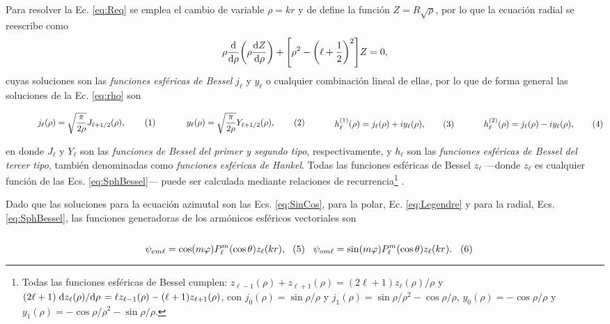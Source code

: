 Para resolver la Ec. \eqref{eq:Req} se emplea el cambio de variable $\rho = k r$ y de define la función $Z =R\sqrt{\rho}$, por lo que la ecuación radial se reescribe como 
	\begin{align}
	\rho \dv{\rho}\qty(\rho\dv{Z}{\rho})+\qty[\rho^2-\qty(\ell+\frac12)^2] Z = 0,
	\label{eq:rho}
	\end{align}
cuyas soluciones son las \emph{funciones esféricas de Bessel} $j_\ell$ y $y_\ell$ o cualquier combinación lineal de ellas, por lo que de forma general las soluciones de la Ec. \eqref{eq:rho} son \cite{arfken2001methods} 

	\begin{subequations}
	\eqhalf{j_\ell (\rho) = \sqrt{\frac{\pi}{2\rho}} J_{\ell+1/2}(\rho), \label{eqs:jn}}
	\eqhalf{y_\ell (\rho) = \sqrt{\frac{\pi}{2\rho}} Y_{\ell+1/2}(\rho), \label{eqs:yn}}
	\eqhalf{h_\ell^{(1)} (\rho) = j_\ell(\rho) + i y_\ell(\rho), \label{eqs:h1}}
	\eqhalf{h_\ell^{(2)} (\rho) =  j_\ell(\rho) - i y_\ell(\rho), \label{eqs:h2}}
	\label{eq:SphBessel}
	\end{subequations}

\noindent	
en donde $J_\ell$ y $Y_\ell$ son las \emph{funciones de Bessel del primer y segundo tipo}, respectivamente, y $h_\ell$ son las \emph{funciones esféricas de Bessel del tercer tipo}, también denominadas como \emph{funciones esféricas de Hankel}. Todas las funciones esféricas de Bessel $z_\ell$ ---donde $z_\ell$ es cualquier función de las Ecs. \eqref{eq:SphBessel}--- puede ser calculada mediante relaciones de recurrencia\footnote{Todas las funciones esféricas de Bessel cumplen: $	z_{\ell-1}(\rho) + z_{\ell+1}(\rho) =(2\ell+1)z_\ell(\rho)/\rho$ y $(2\ell + 1) \dv*{z_\ell(\rho)}{\rho} = \ell z_{\ell-1}(\rho) - (\ell+1)z_{\ell+1}(\rho)$, con  $j_0(\rho) = \sin\rho / \rho$ y $j_1(\rho) = \sin\rho / \rho^2- \cos\rho/\rho$, $y_0(\rho) = -\cos\rho/\rho$ y $y_1(\rho) = -\cos\rho/\rho^2-\sin\rho/\rho$.} \cite{arfken2001methods}.

Dado que las soluciones para la ecuación azimutal son las Ecs. \eqref{eq:SinCos}, para la polar, Ec. \eqref{eq:Legendre} y para la radial, Ecs. \eqref{eq:SphBessel}, las funciones generadoras de los armónicos esféricos vectoriales son\begin{subequations}\vspace*{-2em}

	\eqhalf{\psi_{em\ell} = \cos(m\varphi) P_\ell^m( \cos \theta) z_\ell(k r),}
	\eqhalf{\psi_{om\ell} = \sin(m\varphi) P_\ell^m( \cos \theta) z_\ell(k r).}
	\label{eq:psieo}	\end{subequations}\vspace*{-1em}


